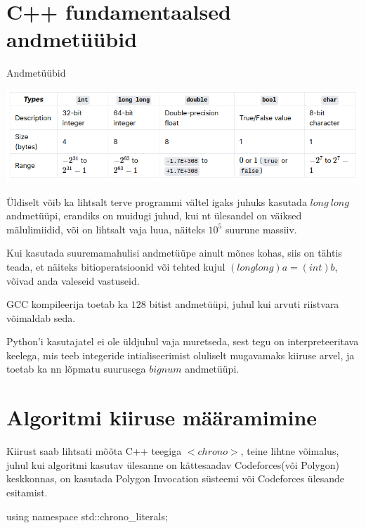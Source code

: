 \documentclass{trkut}
\theoremstyle{definition}
\begin{document}
\begin{appendices}
\chapter{C++ fundamentaalsed andmetüübid}\label{lisa4}
    \tiny
    \normalsize
    
    \begin{table}[H]%
    \caption{Andmetüübid}%
    \includegraphics[width=14cm]{datatypes.png}%
    \label{pragmas}%
    \end{table}

    Üldiselt võib ka lihtsalt terve programmi vältel igaks juhuks kasutada $long\ long$ andmetüüpi, erandiks on muidugi juhud, kui nt ülesandel on väiksed mälulimiidid, või on lihtsalt vaja luua, näiteks $10^5$ suurune massiiv.

    Kui kasutada suuremamahulisi andmetüüpe ainult mõnes kohas, siis on tähtis teada, et näiteks bitioperatsioonid või tehted kujul $(long long) a = (int) b$, võivad anda valeseid vastuseid.

    GCC kompileerija toetab ka $128$ bitist andmetüüpi, juhul kui arvuti riistvara võimaldab seda.
    
    Python'i kasutajatel ei ole üldjuhul vaja muretseda, sest tegu on interpreteeritava keelega, mis teeb integeride intialiseerimist oluliselt mugavamaks kiiruse arvel, ja toetab ka nn lõpmatu suurusega $bignum$ andmetüüpi\parencite{usaco2}.

 \chapter{Algoritmi kiiruse määramimine}\label{lisa5}
    \tiny
    \normalsize
    Kiirust saab lihtsati mõõta C++ teegiga $<chrono>$, teine lihtne võimalus, juhul kui algoritmi kasutav ülesanne on kättesaadav Codeforces(või Polygon) keskkonnas, on 
    kasutada Polygon Invocation süsteemi või Codeforces ülesande esitamist.

    \begin{cclol}
using namespace std::chrono_literals;


\end{cclol}
\end{appendices}
\end{document}
